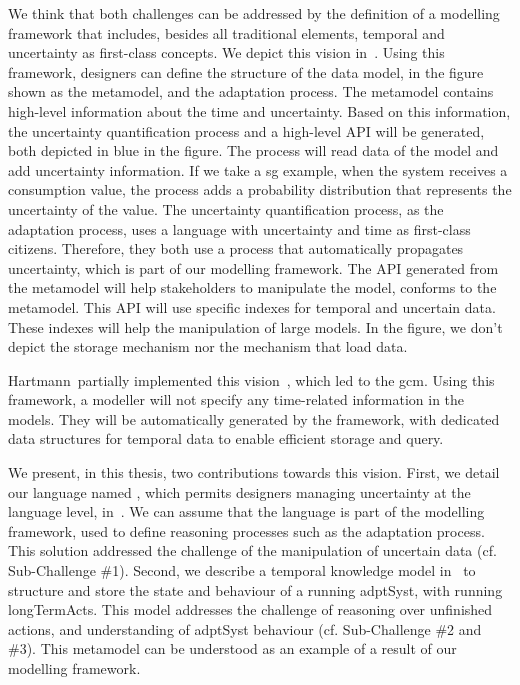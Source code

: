 We think that both challenges can be addressed by the definition of a modelling framework that includes, besides all traditional elements, temporal and uncertainty as first-class concepts.
We depict this vision in~.
Using this framework, designers can define the structure of the data model, in the figure shown as the \gls{metamodel}, and the adaptation process.
The \gls{metamodel} contains high-level information about the time and uncertainty.
Based on this information, the uncertainty quantification process and a high-level API will be generated, both depicted in blue in the figure.
The process will read data of the model and add uncertainty information.
If we take a \gls{sg} example, when the system receives a consumption value, the process adds a probability distribution that represents the uncertainty of the value.
The uncertainty quantification process, as the adaptation process, uses a language with uncertainty and time as first-class citizens.
Therefore, they both use a process that automatically propagates uncertainty, which is part of our modelling framework.
The API generated from the \gls{metamodel} will help stakeholders to manipulate the model, conforms to the \gls{metamodel}.
This API will use specific indexes for temporal and uncertain data.
These indexes will help the manipulation of large models.
In the figure, we don't depict the storage mechanism nor the mechanism that load data.

Hartmann~\etal partially implemented this vision~\cite{DBLP:journals/is/HartmannFMRT19}, which led to the \gls{gcm}. 
Using this framework, a modeller will not specify any time-related information in the models.
They will be automatically generated by the framework, with dedicated data structures for temporal data to enable efficient storage and query.

We present, in this thesis, two contributions towards this vision.
First, we detail our language named \langName{}, which permits designers managing uncertainty at the language level, in~.
We can assume that the language is part of the modelling framework, used to define reasoning processes such as the adaptation process.
This solution addressed the challenge of the manipulation of uncertain data (cf. Sub-Challenge \#1). 
Second, we describe a temporal knowledge model in~ to structure and store the state and behaviour of a running \gls{adptSyst}, with running \glspl{longTermAct}.
This model addresses the challenge of reasoning over unfinished actions, and understanding of \gls{adptSyst} \gls{behaviour} (cf. Sub-Challenge \#2 and \#3).
This \gls{metamodel} can be understood as an example of a result of our modelling framework.


